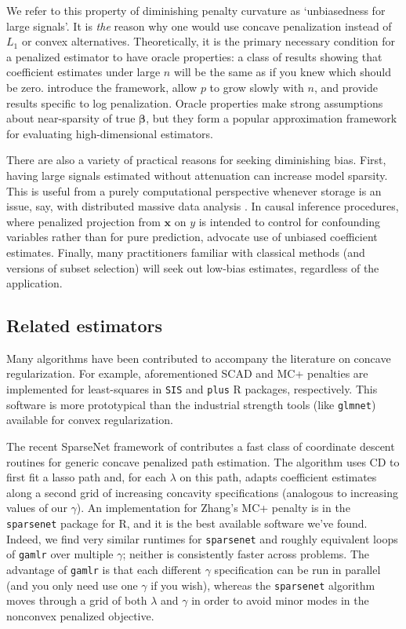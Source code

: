 \documentclass[12pt]{article}
\newcommand{\bs}[1]{\boldsymbol{#1}}
\newcommand{\bm}[1]{\mathbf{#1}}
\begin{document}
We refer to this property of diminishing penalty curvature as `unbiasedness
for large signals'. It is {\it the} reason why one would use concave
penalization instead of $L_1$ or convex alternatives.  Theoretically, it is
the primary necessary condition for a penalized estimator to have
oracle properties: a class of results showing that coefficient
estimates under large $n$ will be the same as if you knew which
should be zero.  \citet{fan_variable_2001} introduce the framework,
\citet{fan_nonconcave_2004} allow $p$ to grow slowly with $n$, 
and \citet{armagan_posterior_2013} provide results specific to log penalization.
Oracle properties make strong assumptions
about near-sparsity of true $\bs{\beta}$, but they form a popular
 approximation framework for evaluating  
high-dimensional estimators. 

There are also a variety of practical reasons for seeking diminishing bias.
First, having large signals estimated without attenuation can increase model
sparsity. This is useful from a purely computational perspective whenever
storage is an issue, say, with distributed massive data analysis
\citep{taddy_distributed_2013}. In causal inference procedures, where
penalized projection from $\bm{x}$ on $y$ is intended to control for
confounding variables rather than for pure prediction,
\citet{belloni_inference_2012} advocate use of unbiased coefficient estimates.
Finally, many
practitioners familiar with classical methods (and versions of subset
selection) will seek out low-bias estimates, regardless of the application.


\subsection{Related estimators}
\label{lla}


Many algorithms have been contributed to accompany the literature on concave
regularization. For example, aforementioned SCAD and MC+ penalties are
implemented for least-squares  in {\tt SIS} and {\tt plus} {\sf R} packages,
respectively.  This software is more prototypical than the industrial
strength tools (like {\tt glmnet}) available for convex regularization.

The recent SparseNet framework of \citet{mazumder_sparsenet_2011} contributes
a  fast class of coordinate descent routines for generic concave penalized
path estimation. The algorithm uses CD to first fit a lasso path and, for each
$\lambda$ on this path, adapts coefficient estimates along a second grid of
increasing concavity specifications (analogous to increasing values of our
$\gamma$). An  implementation for Zhang's MC+ penalty is in the {\tt
sparsenet} package for {\sf R}, and it is the best available software we've
found.  Indeed, we find very similar runtimes for {\tt sparsenet} and roughly
equivalent loops of {\tt gamlr} over multiple $\gamma$; neither is
consistently faster across problems.  The advantage of {\tt gamlr} is that
each different $\gamma$ specification can be run in parallel (and you only
need use one $\gamma$ if you wish), whereas the {\tt sparsenet}
algorithm moves through a grid of both $\lambda$ and $\gamma$ in order to
avoid minor modes in the nonconvex penalized objective.
\end{document}
